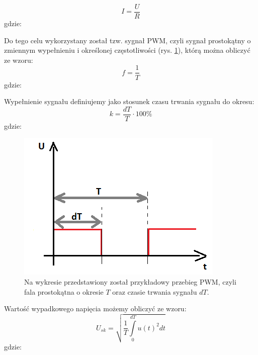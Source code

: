 \begin{equation}
	I = \frac{U}{R}
   \label{eq:prawo_ohma}
 \end{equation}
 gdzie:  
 \begin{equationDescriptor}
 \end{equationDescriptor}
\noindent
Do tego celu wykorzystany został tzw. sygnał PWM, czyli sygnał prostokątny o zmiennym wypełnieniu i określonej częstotliwości (rys. \ref{sygnal_PWM}), którą można obliczyć ze wzoru:
\begin{equation}
	f =  \frac{1}{T}
   \label{eq:czestotliwosc}
 \end{equation}
 gdzie:  
 \begin{equationDescriptor}
 \end{equationDescriptor}
\noindent
 Wypełnienie sygnału definiujemy jako stosunek czasu trwania sygnału do okresu:
 \begin{equation}
	k =  \frac{dT}{T} \cdot 100\%
   \label{eq:wsp_wypelnienia}
 \end{equation}
 gdzie:  
 \begin{equationDescriptor}
 \end{equationDescriptor}
  \begin{figure}[H]
    \begin{center}
      \includegraphics[scale=0.65]{imgs/wykres.png}
 	\caption[Sygnał PWM.]{\small{Na wykresie przedstawiony został przykładowy przebieg PWM, czyli fala prostokątna o okresie $T$ oraz czasie trwania sygnału $dT$.}}
	\label{sygnal_PWM}
    \end{center}
  \end{figure}  
  \noindent
  Wartość wypadkowego napięcia możemy obliczyć ze wzoru:
  \begin{equation}
	U_{sk}=\sqrt{\frac{1}{T}\int\limits_{0}^{dT}u(t)^2dt}
   \label{eq:napiecie_skuteczne}
 \end{equation}
 gdzie:  
 \begin{equationDescriptor}
 \end{equationDescriptor}
 
